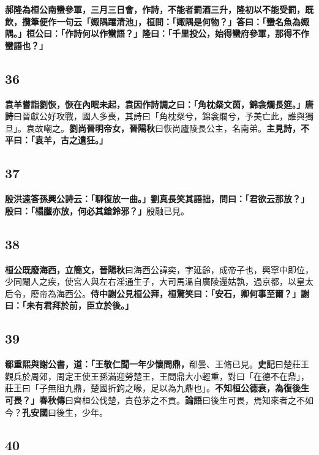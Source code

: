 \textbf{郝隆為桓公南蠻參軍，三月三日會，作詩，不能者罰酒三升，隆初以不能受罰，既飲，攬筆便作一句云「娵隅躍清池」，桓問：「娵隅是何物？」答曰：「蠻名魚為娵隅。」桓公曰：「作詩何以作蠻語？」隆曰：「千里投公，始得蠻府參軍，那得不作蠻語也？」}

\subsection*{36}

\textbf{袁羊嘗詣劉恢，恢在內眠未起，袁因作詩調之曰：「角枕粲文茵，錦衾爛長筵。」}{\footnotesize \textbf{唐詩}曰晉獻公好攻戰，國人多喪，其詩曰「角枕粲兮，錦衾爛兮，予美亡此，誰與獨旦」。袁故嘲之。}\textbf{劉尚晉明帝女，}{\footnotesize \textbf{晉陽秋}曰恢尚廬陵長公主，名南弟。}\textbf{主見詩，不平曰：「袁羊，古之遺狂。」}

\subsection*{37}

\textbf{殷洪遠答孫興公詩云：「聊復放一曲。」劉真長笑其語拙，問曰：「君欲云那放？」殷曰：「榻臘亦放，何必其鎗鈴邪？」}{\footnotesize 殷融已見。}

\subsection*{38}

\textbf{桓公既廢海西，立簡文，}{\footnotesize \textbf{晉陽秋}曰海西公諱奕，字延齡，成帝子也，興寧中即位，少同閹人之疾，使宮人與左右淫通生子，大司馬溫自廣陵還姑孰，過京都，以皇太后令，廢帝為海西公。}\textbf{侍中謝公見桓公拜，桓驚笑曰：「安石，卿何事至爾？」謝曰：「未有君拜於前，臣立於後。」}

\subsection*{39}

\textbf{郗重熙與謝公書，道：「王敬仁聞一年少懷問鼎，}{\footnotesize 郗曇、王脩已見。\textbf{史記}曰楚莊王觀兵於周郊，周定王使王孫滿迎勞楚王，王問鼎大小輕重，對曰「在德不在鼎」，莊王曰「子無阻九鼎，楚國折鉤之喙，足以為九鼎也」。}\textbf{不知桓公德衰，為復後生可畏？」}{\footnotesize \textbf{春秋傳}曰齊桓公伐楚，責苞茅之不貢。\textbf{論語}曰後生可畏，焉知來者之不如今？\textbf{孔安國}曰後生，少年。}

\subsection*{40}

